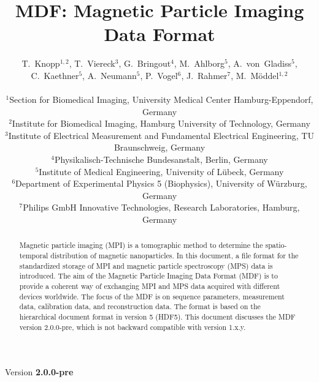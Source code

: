 \documentclass[landscape,a4paper]{article} %
\begin{document}
\title{MDF: Magnetic Particle Imaging Data Format}
\newcommand{\version}{2.0.0-pre}

\author{
T.~Knopp$^{1,2}$, T.~Viereck$^3$, G.~Bringout$^4$, M.~Ahlborg$^5$, A.~von~Gladiss$^5$, C.~Kaethner$^5$, A.~Neumann$^5$, P.~Vogel$^6$, J.~Rahmer$^7$, M.~M\"oddel$^{1,2}$ \\ \\
$^1$Section for Biomedical Imaging, University Medical Center Hamburg-Eppendorf, Germany\\
$^2$Institute for Biomedical Imaging, Hamburg University of Technology, Germany\\
$^3$Institute of Electrical Measurement and Fundamental Electrical Engineering, TU Braunschweig, Germany\\
$^4$Physikalisch-Technische Bundesanstalt, Berlin, Germany\\
$^5$Institute of Medical Engineering, University of  Lübeck, Germany\\
$^6$Department of Experimental Physics 5 (Biophysics), University of Würzburg, Germany\\
$^7$Philips GmbH Innovative Technologies, Research Laboratories, Hamburg, Germany
}

\maketitle
\begin{center}
Version \textbf{\version}
\end{center}

\begin{abstract}
Magnetic particle imaging (MPI) is a tomographic method to determine the spatio-temporal distribution of magnetic nanoparticles. In this document, a file format for the standardized storage of MPI and magnetic particle spectroscopy (MPS) data is introduced. The aim of the Magnetic Particle Imaging Data Format (MDF) is to provide a coherent way of exchanging MPI and MPS data acquired with different devices worldwide. The focus of the MDF is on sequence parameters, measurement data, calibration data, and reconstruction data. The format is based on the hierarchical document format in version 5 (HDF5). This document discusses the MDF version \version, which is not backward compatible with version 1.x.y.
\end{abstract}
\end{document}
